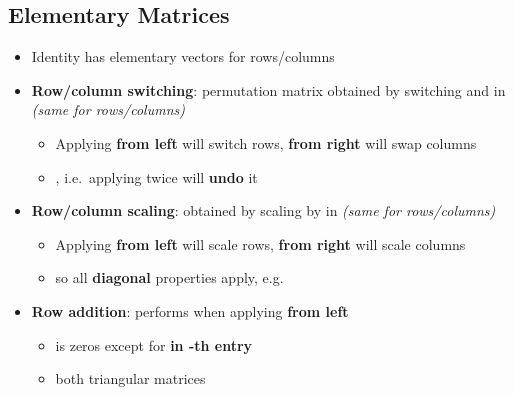 \subsection*{Elementary Matrices}

\begin{itemize}

  \item
        Identity
        has elementary vectors 
        for rows/columns
  \item
        \textbf{Row/column switching}: permutation matrix 
        obtained by switching  and
         in  \emph{(same for
          rows/columns)}

        \begin{itemize}

          \item
                Applying  \textbf{from left} will switch rows,
                \textbf{from right} will swap columns
          \item
                , i.e.~applying twice
                will \textbf{undo} it
        \end{itemize}
  \item
        \textbf{Row/column scaling}:  obtained by
        scaling  by \iMbox{\lambda} in
         \emph{(same for rows/columns)}

        \begin{itemize}

          \item
                Applying  \textbf{from left} will scale rows,
                \textbf{from right} will scale columns
          \item
                so all \textbf{diagonal} properties apply,
                e.g.~
        \end{itemize}
  \item
        \textbf{Row addition}:
        performs  when
        applying \textbf{from left}

        \begin{itemize}

          \item
                 is zeros except
                for \textbf{\iMbox{\lambda} in -th entry}
          \item
                 both triangular
                matrices
        \end{itemize}
\end{itemize}


